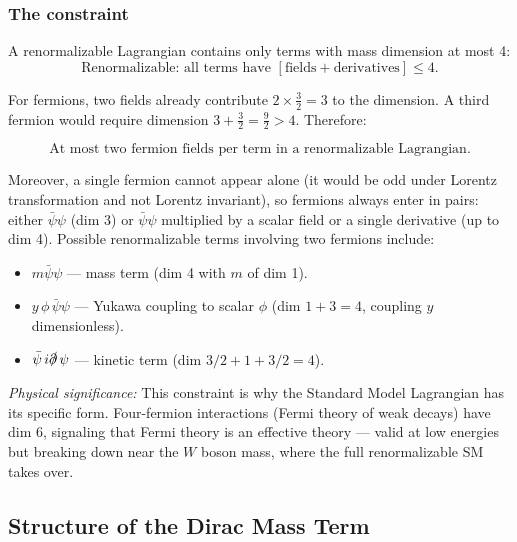\documentclass[../main.tex]{subfiles}
\begin{document}
\subsubsection*{The constraint}

A renormalizable Lagrangian contains only terms with mass dimension at most 4:
\begin{equation}
  \boxed{\text{Renormalizable: all terms have } [\text{fields}+\text{derivatives}] \leq 4.}
  \label{eq:lec08:renorm}
\end{equation}

For fermions, two fields already contribute $2 \times \tfrac{3}{2} = 3$ to the dimension.  A third fermion would require dimension $3 + \tfrac{3}{2} = \tfrac{9}{2} > 4$.  Therefore:

\begin{equation}
  \boxed{\text{At most two fermion fields per term in a renormalizable Lagrangian.}}
  \label{eq:lec08:two-fermion}
\end{equation}

Moreover, a single fermion cannot appear alone (it would be odd under Lorentz transformation and not Lorentz invariant), so fermions always enter in pairs: either $\bar\psi\psi$ (dim 3) or $\bar\psi\psi$ multiplied by a scalar field or a single derivative (up to dim 4).  Possible renormalizable terms involving two fermions include:
\begin{itemize}
  \item $m\bar\psi\psi$ — mass term (dim 4 with $m$ of dim 1).
  \item $y\,\phi\,\bar\psi\psi$ — Yukawa coupling to scalar $\phi$ (dim $1+3=4$, coupling $y$ dimensionless).
  \item $\bar\psi\,i\slashed\partial\,\psi$ — kinetic term (dim $3/2 + 1 + 3/2 = 4$).
\end{itemize}

\textit{Physical significance:} This constraint is why the Standard Model Lagrangian has its specific form.  Four-fermion interactions (Fermi theory of weak decays) have dim 6, signaling that Fermi theory is an effective theory — valid at low energies but breaking down near the $W$ boson mass, where the full renormalizable SM takes over.

\subsection*{Structure of the Dirac Mass Term}
\end{document}
